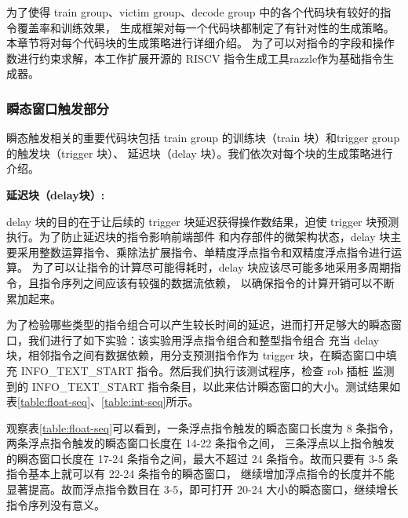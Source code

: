 为了使得 train group、victim group、decode group 中的各个代码块有较好的指令覆盖率和训练效果，
生成框架对每一个代码块都制定了有针对性的生成策略。本章节将对每个代码块的生成策略进行详细介绍。
为了可以对指令的字段和操作数进行约束求解，本工作扩展开源的 RISCV 指令生成工具razzle\cite{razzle}作为基础指令生成器。

\subsubsection{瞬态窗口触发部分}

瞬态触发相关的重要代码块包括 train group 的训练块（train 块）和trigger group 的触发块（trigger 块）、
延迟块（delay 块）。我们依次对每个块的生成策略进行介绍。\par

\textbf{延迟块（delay块）:}\par
delay 块的目的在于让后续的 trigger 块延迟获得操作数结果，迫使 trigger 块预测执行。为了防止延迟块的指令影响前端部件
和内存部件的微架构状态，delay 块主要采用整数运算指令、乘除法扩展指令、单精度浮点指令和双精度浮点指令进行运算。
为了可以让指令的计算尽可能得耗时，delay 块应该尽可能多地采用多周期指令，且指令序列之间应该有较强的数据流依赖，
以确保指令的计算开销可以不断累加起来。\par

为了检验哪些类型的指令组合可以产生较长时间的延迟，进而打开足够大的瞬态窗口，我们进行了如下实验：该实验用浮点指令组合和整型指令组合
充当 delay 块，相邻指令之间有数据依赖，用分支预测指令作为 trigger 块，在瞬态窗口中填充 INFO\_TEXT\_START 指令。然后我们执行该测试程序，检查 rob 插桩
监测到的 INFO\_TEXT\_START 指令条目，以此来估计瞬态窗口的大小。测试结果如表\ref{table:float-seq}、\ref{table:int-seq}所示。\par

观察表\ref{table:float-seq}可以看到，一条浮点指令触发的瞬态窗口长度为 8 条指令，两条浮点指令触发的瞬态窗口长度在 14-22 条指令之间，
三条浮点以上指令触发的瞬态窗口长度在 17-24 条指令之间，最大不超过 24 条指令。故而只要有 3-5 条指令基本上就可以有 22-24 条指令的瞬态窗口，
继续增加浮点指令的长度并不能显著提高。故而浮点指令数目在 3-5，即可打开 20-24 大小的瞬态窗口，继续增长指令序列没有意义。\par

